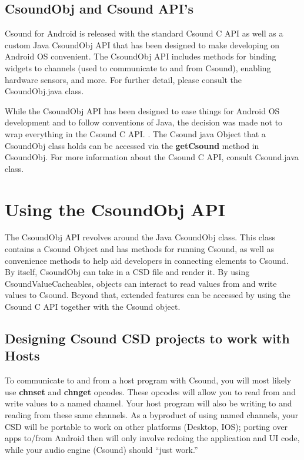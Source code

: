 \documentclass[11pt]{article}
\begin{document}
\subsection{CsoundObj and Csound API's}

Csound for Android is released with the standard Csound C API as well as a custom Java CsoundObj API that has been designed to make developing on Android OS convenient.  The CsoundObj API includes methods for binding widgets to channels (used to communicate to and from Csound), enabling hardware sensors, and more.  For further detail, please consult the CsoundObj.java class.

While the CsoundObj API has been designed to ease things for Android OS development and to follow conventions of Java, the decision was made not to wrap everything in the Csound C API. . The Csound java Object that a CsoundObj class holds can be accessed via the \textbf{getCsound} method in CsoundObj.  For more information about the Csound C API, consult Csound.java class.

\section{Using the CsoundObj API}

The CsoundObj API revolves around the Java CsoundObj class. This class contains a Csound Object and has methods for running Csound, as well as convenience methods to help aid developers in connecting elements to Csound. By itself, CsoundObj can take in a CSD file and render it.  By using CsoundValueCacheables, objects can interact to read values from and write values to Csound.  Beyond that, extended features can be accessed by using the Csound C API together with the Csound object.

\subsection{Designing Csound CSD projects to work with Hosts}

To communicate to and from a host program with Csound, you will most likely use \textbf{chnset} and \textbf{chnget} opcodes. These opcodes will allow you to read from and write values to a named channel.  Your host program will also be writing to and reading from these same channels.  As a byproduct of using named channels, your CSD will be portable to work on other platforms (Desktop, IOS); porting over apps to/from Android then will only involve redoing the application and UI code, while your audio engine (Csound) should ``just work.'' 
\end{document}
